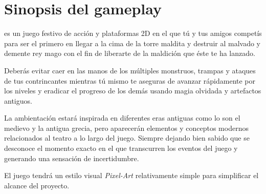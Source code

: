 \section{Sinopsis del gameplay}%



\emph{\izenburua } es un juego festivo de acción y plataformas 2D en el que tú y
tus amigos competís para ser el primero en llegar a la cima de la torre maldita
y destruir al malvado y demente rey mago con el fin de liberarte de la maldición
que éste te ha lanzado.




Deberás evitar caer en las manos de los múltiples monstruos, trampas y ataques
de tus contrincantes mientras tú mismo te aseguras de avanzar rápidamente por
los niveles y eradicar el progreso de los demás usando magia olvidada y
artefactos antiguos.


La ambientación estará inspirada en diferentes eras antiguas como lo son el
medievo y la antigua grecia, pero aparecerán elementos y conceptos modernos
relacionados al teatro a lo largo del juego. Siempre dejando bien sabido que se
desconoce el momento exacto en el que transcurren los eventos del juego y
generando una sensación de incertidumbre.


El juego tendrá un estilo visual \emph{Pixel-Art} relativamente simple para
simplificar el alcance del proyecto.